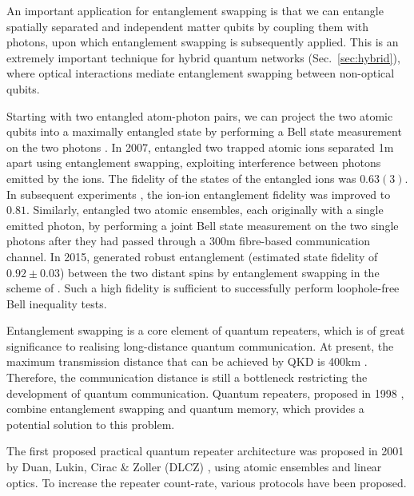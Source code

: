 \documentclass[aps, rmp, twocolumn, amsmath, amssymb, nofootinbib, superscriptaddress, longbibliography, floatfix, table-of-contents, eqsecnum]{revtex4-1}
\begin{document}
An important application for entanglement swapping is that we can entangle spatially separated and independent matter qubits by coupling them with photons, upon which entanglement swapping is subsequently applied. This is an extremely important technique for hybrid quantum networks (Sec.~\ref{sec:hybrid}), where optical interactions mediate entanglement swapping between non-optical qubits.

Starting with two entangled atom-photon pairs, we can project the two atomic qubits into a maximally entangled state by performing a Bell state measurement on the two photons \cite{bib:Nature_428_153, bib:PRL_96_030404}. In 2007, \cite{bib:Nature_449_68} entangled two trapped atomic ions separated 1m apart using entanglement swapping, exploiting interference between photons emitted by the ions. The fidelity of the states of the entangled ions was $0.63(3)$. In subsequent experiments \cite{bib:PRL_100_150404}, the ion-ion entanglement fidelity was improved to $0.81$. Similarly, \cite{bib:Nature_454_1098} entangled two atomic ensembles, each originally with a single emitted photon, by performing a joint Bell state measurement on the two single photons after they had passed through a 300m fibre-based communication channel. In 2015, \cite{bib:Nature_526_682} generated robust entanglement (estimated state fidelity of $0.92\pm0.03$) between the two distant spins by entanglement swapping in the scheme of \cite{bib:PRA_71_060310, bib:Nature_497_86}. Such a high fidelity is sufficient to successfully perform loophole-free Bell inequality tests.

Entanglement swapping is a core element of quantum repeaters, which is of great significance to realising long-distance quantum communication. At present, the maximum transmission distance that can be achieved by QKD is 400km \cite{bib:arxiv_1606.06821}. Therefore, the communication distance is still a bottleneck restricting the development of quantum communication. Quantum repeaters, proposed in 1998 \cite{bib:PRL_81_5932}, combine entanglement swapping and quantum memory, which provides a potential solution to this problem.

The first proposed practical quantum repeater architecture was proposed in 2001 by Duan, Lukin, Cirac \& Zoller (DLCZ) \cite{bib:DLCZ}, using atomic ensembles and linear optics. To increase the repeater count-rate, various protocols \cite{bib:RMP_83_33, bib:PRA_79_042340, bib:PRA_92_012307, bib:PRA_81_052311, bib:PRA_81_052329, bib:NP_6_777, bib:PRL_112_250501} have been proposed.
\end{document}
